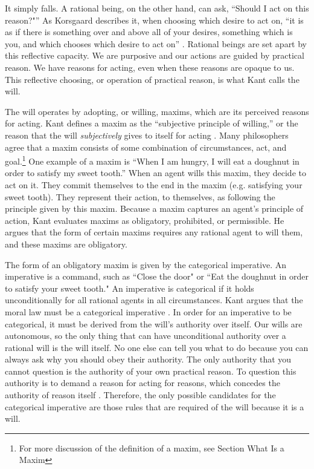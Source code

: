 \begin{isabellebody}
\begin{isamarkuptext}
It simply falls. A rational being, on the other hand, can ask, ``Should I act on this reason?"''
As Korsgaard describes it, when choosing which desire to act on, ``it is as if there is something over 
and above all of your desires, something which is you, and which chooses which desire to act on'' \citep[100]{sources}. 
Rational beings are set apart by this reflective capacity. We are purposive and 
our actions are guided by practical reason. We have reasons for acting, even when these reasons are
opaque to us. This reflective choosing, or operation of practical reason, is what Kant calls the will. 

The will operates by adopting, or willing, maxims, which are its perceived reasons for acting. Kant defines a maxim as 
the ``subjective principle of willing,'' or the reason that the will \emph{subjectively} gives 
to itself for acting \citep[16 footnote 1]{groundwork}. Many philosophers agree that a maxim consists 
of some combination of circumstances, 
act, and goal.\footnote{For more discussion of the definition of a maxim, see Section What Is a Maxim}
One example of a maxim is ``When I am hungry, I will eat a doughnut in order to satisfy my sweet tooth.''
When an agent wills this maxim, they decide to act on it. They commit themselves to the end in the maxim 
(e.g. satisfying your sweet tooth). They represent their action, to themselves, as following the 
principle given by this maxim. Because a maxim captures an agent's principle of action, Kant evaluates
maxims as obligatory, prohibited, or permissible. He argues that the form of certain maxims 
requires any rational agent to will them, and these maxims are obligatory. 

The form of an obligatory maxim is given by the categorical imperative. 
An imperative is a command, such as ``Close the door" or ``Eat the doughnut in order to satisfy your 
sweet tooth." An imperative is categorical if it holds unconditionally for all rational agents in all 
circumstances. Kant argues that the moral law must be a categorical imperative \citep[5]{groundwork}. 
In order for an imperative to be categorical, it must be derived from the will's authority over itself. 
Our wills are autonomous, so the only thing that can have unconditional authority over a rational will is 
the will itself. No one else can tell you what to do because you can always ask why you 
should obey their authority. The only authority that you cannot question is the authority of your own 
practical reason. To question this authority is to demand a reason for acting for reasons, which 
concedes the authority of reason itself \citep[23]{velleman}. Therefore, the only possible candidates 
for the categorical imperative are those rules that are required of the will because it is a will. 


\end{isamarkuptext}
\end{isabellebody}
